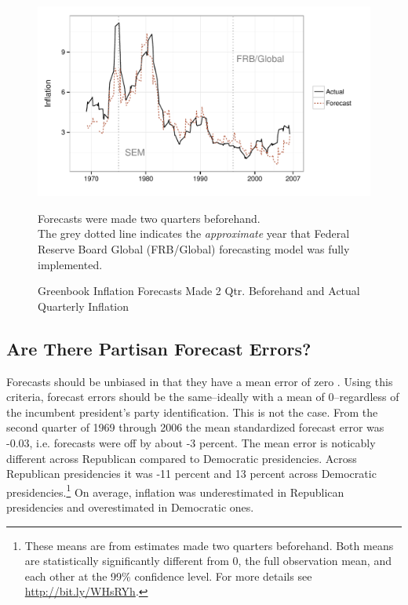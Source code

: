 \documentclass[a4paper]{article}\usepackage{graphicx, color}
\newenvironment{knitrout}{}{} %
\begin{document}
\begin{figure}[t]
    \caption{Greenbook Inflation Forecasts Made 2 Qtr. Beforehand and Actual Quarterly Inflation}
    \label{absolute}
    \begin{center}
    
\begin{knitrout}
\color{fgcolor}

{\centering \includegraphics[width=0.8\linewidth]{figure/BaseInflation} 

}



\end{knitrout}

    
    \end{center}
    \begin{singlespace}
        {\scriptsize{Forecasts were made two quarters beforehand. \\
                     The grey dotted line indicates the {\emph{approximate}} year that Federal Reserve Board Global (FRB/Global) forecasting model was fully implemented.  
                      }}
    \end{singlespace}
\end{figure}


\subsection{Are There Partisan Forecast Errors?}




Forecasts should be unbiased in that they have a mean error of zero \citep[5]{Bruck2006}. Using this criteria, forecast errors should be the same--ideally with a mean of 0--regardless of the incumbent president's party identification. This is not the case. From the second quarter of 1969 through 2006 the mean standardized forecast error was -0.03, i.e. forecasts were off by about -3 percent. The mean error is noticably different across Republican compared to Democratic presidencies. Across Republican presidencies it was -11 percent and 13 percent across Democratic presidencies.\footnote{These means are from estimates made two quarters beforehand. Both means are statistically significantly different from 0, the full observation mean, and each other at the 99\% confidence level. For more details see \url{http://bit.ly/WHsRYh}.} On average, inflation was underestimated in Republican presidencies and overestimated in Democratic ones.
\end{document}
